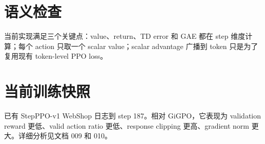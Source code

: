 \documentclass[10pt]{ctexart}
\begin{document}
\section*{语义检查}
当前实现满足三个关键点：value、return、TD error 和 GAE 都在 step 维度计算；每个 action 只取一个 scalar value；scalar advantage 广播到 token 只是为了复用现有 token-level PPO loss。

\section*{当前训练快照}
已有 StepPPO-v1 WebShop 日志到 step 187。相对 GiGPO，它表现为 validation reward 更低、valid action ratio 更低、response clipping 更高、gradient norm 更大。详细分析见文档 009 和 010。
\end{document}
